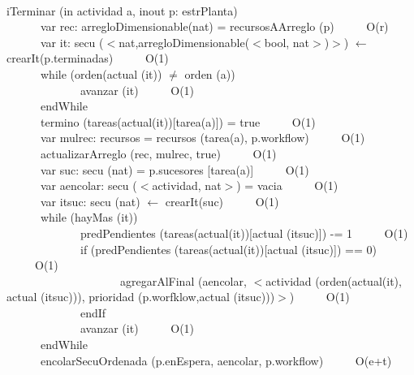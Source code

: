 \documentclass[a4paper,10pt]{article}
\begin{document}
\begin{algoritmo}
\caption{}\\
  iTerminar (in actividad a, inout p: estrPlanta) \\
	\indent \ \ \ \ \ \ var rec: arregloDimensionable(nat) = recursosAArreglo (p)  \ \ \ \ \ O(r)\\
	\indent \ \ \ \ \ \ var it: secu ($<$nat,arregloDimensionable($<$bool, nat$>$)$>$) $\gets$ crearIt(p.terminadas)  \ \ \ \ \ O(1)\\
	\indent \ \ \ \ \ \ while (orden(actual (it)) $\neq$ orden (a))   \ \ \ \ \ \\
	\indent \ \ \ \ \ \ \ \ \ \ \ \ \ avanzar (it) \ \ \ \ \ O(1)\\
	\indent \ \ \ \ \ \ endWhile \ \ \ \ \ \\
	\indent \ \ \ \ \ \ termino (tareas(actual(it))[tarea(a)]) = true  \ \ \ \ \ O(1) \\
	\indent \ \ \ \ \ \ var mulrec: recursos = recursos (tarea(a), p.workflow)   \ \ \ \ \ O(1) \\
	\indent \ \ \ \ \ \ actualizarArreglo (rec, mulrec, true)   \ \ \ \ \ O(1) \\
	\indent \ \ \ \ \ \ var suc: secu (nat) = p.sucesores [tarea(a)] \ \ \ \ \ O(1) \\
	\indent \ \ \ \ \ \ var aencolar: secu ($<$actividad, nat$>$) = vacia \ \ \ \ \ O(1) \\
	\indent \ \ \ \ \ \ var itsuc: secu (nat) $\gets$ crearIt(suc)  \ \ \ \ \ O(1)\\
	\indent \ \ \ \ \ \ while (hayMas (it))   \ \ \ \ \ \\
	\indent \ \ \ \ \ \ \ \ \ \ \ \ \ predPendientes (tareas(actual(it))[actual (itsuc)]) -= 1 \ \ \ \ \ O(1)\\
	\indent \ \ \ \ \ \ \ \ \ \ \ \ \ if (predPendientes (tareas(actual(it))[actual (itsuc)]) == 0) \ \ \ \ \ O(1)\\
	\indent \ \ \ \ \ \ \ \ \ \ \ \ \ \ \ \ \ \ \ \ agregarAlFinal (aencolar, $<$actividad (orden(actual(it), actual (itsuc))), prioridad (p.worfklow,actual (itsuc)))$>$) \ \ \ \ \ O(1)\\
	\indent \ \ \ \ \ \ \ \ \ \ \ \ \ endIf \\
	\indent \ \ \ \ \ \ \ \ \ \ \ \ \ avanzar (it) \ \ \ \ \ O(1)\\
	\indent \ \ \ \ \ \ endWhile \ \ \ \ \ \\
	\indent \ \ \ \ \ \ encolarSecuOrdenada (p.enEspera, aencolar, p.workflow) \ \ \ \ \ O(e+t)\\

\end{algoritmo}
\end{document}
